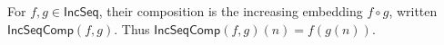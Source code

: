 \begin{definition}
For $f,g\in\mathsf{IncSeq}$, their composition is the increasing embedding
$f\circ g$, written $\mathsf{IncSeqComp}(f,g)$.  Thus
$\mathsf{IncSeqComp}(f,g)(n)=f(g(n))$.
\end{definition}
